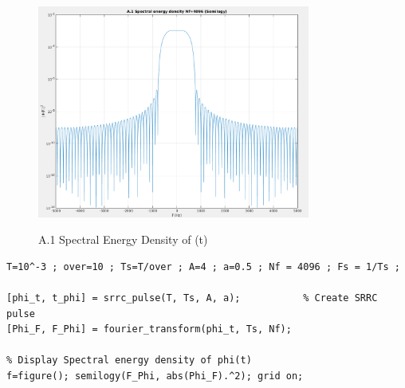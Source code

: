 \documentclass[11pt]{article}
\begin{document}
    \begin{figure}[H]
        \centering
        \includegraphics[scale=0.5, width=0.8\textwidth]{figures/A1-SED.png} \\
        \caption{A.1 Spectral Energy Density of \phi(t)}
    \end{figure}
    
    \begin{lstlisting}[caption = {A.1 Create SRRC pulse and display SED}]
T=10^-3 ; over=10 ; Ts=T/over ; A=4 ; a=0.5 ; Nf = 4096 ; Fs = 1/Ts ; 

[phi_t, t_phi] = srrc_pulse(T, Ts, A, a);           % Create SRRC pulse  
[Phi_F, F_Phi] = fourier_transform(phi_t, Ts, Nf);

% Display Spectral energy density of phi(t)
f=figure(); semilogy(F_Phi, abs(Phi_F).^2); grid on; 
    \end{lstlisting}

\end{document}
